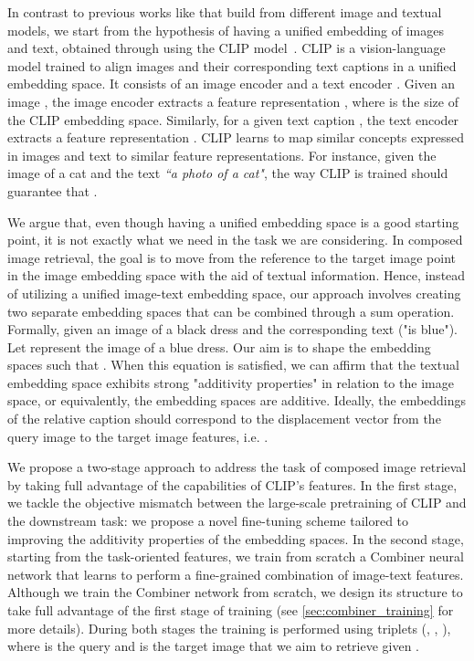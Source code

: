 \documentclass[acmlarge]{acmart}
\begin{document}
In contrast to previous works like \cite{Kim_Yu_Kim_Kim_2021, shin2021rtic, Chen_2020_CVPR, Lee_2021_CVPR} that build from different image and textual models, we start from the hypothesis of having a unified embedding of images and text, obtained through using the CLIP model~\cite{radford2021learning}.
CLIP is a vision-language model trained to align images and their corresponding text captions in a unified embedding space. It consists of an image encoder  and a text encoder . Given an image , the image encoder extracts a feature representation , where  is the size of the CLIP embedding space. Similarly, for a given text caption , the text encoder extracts a feature representation . CLIP learns to map similar concepts expressed in images and text to similar feature representations.
For instance, given the image of a cat  and the text  \textit{``a photo of a cat"}, the way CLIP is trained should guarantee that .

We argue that, even though having a unified embedding space is a good starting point, it is not exactly what we need in the task we are considering. 
In composed image retrieval, the goal is to move from the reference to the target image point in the image embedding space with the aid of textual information. Hence, instead of utilizing a unified image-text embedding space, our approach involves creating two separate embedding spaces that can be combined through a sum operation.
Formally, given an image of a black dress  and the corresponding text  ("is blue"). Let  represent the image of a blue dress. Our aim is to shape the embedding spaces such that . When this equation is satisfied, we can affirm that the textual embedding space exhibits strong "additivity properties" in relation to the image space, or equivalently, the embedding spaces are additive. Ideally, the embeddings of the relative caption should correspond to the displacement vector from the query image to the target image features, i.e. .


We propose a two-stage approach to address the task of composed image retrieval by taking full advantage of the capabilities of CLIP's features.
In the first stage, we tackle the objective mismatch between the large-scale pretraining of CLIP and the downstream task: we propose a novel fine-tuning scheme tailored to improving the additivity properties of the embedding spaces. In the second stage, starting from the task-oriented features, we train from scratch a Combiner neural network that learns to perform a fine-grained combination of image-text features. Although we train the Combiner network from scratch, we design its structure to take full advantage of the first stage of training (see \cref{sec:combiner_training} for more details).
During both stages the training is performed using triplets (, , ), where  is the query and  is the target image that we aim to retrieve given . 
\end{document}
